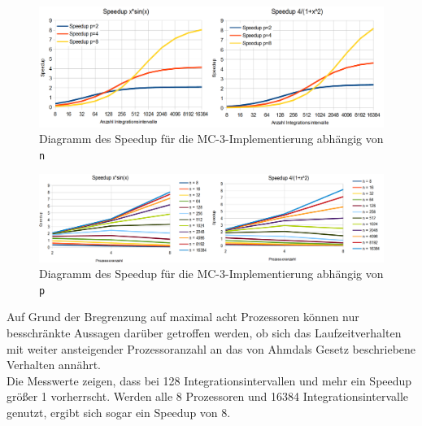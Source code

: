 \documentclass[a4paper,12pt]{scrartcl}
\begin{document}
\begin{figure}[htb]
  \begin{center}
    \includegraphics[width=1\hsize]{../mc3_speedup.png}
  \end{center}
  \caption{\label{mc3speedup}
    Diagramm des Speedup f\"ur die MC-3-Implementierung abh\"angig von \texttt{n}}
\end{figure}
\begin{figure}[htb]
  \begin{center}
    \includegraphics[width=1\hsize]{../mc3_speeduppercpu.png}
  \end{center}
  \caption{\label{mc3speeduppercpu}
    Diagramm des Speedup f\"ur die MC-3-Implementierung abh\"angig von \texttt{p}}
\end{figure}
Auf Grund der Bregrenzung auf maximal acht Prozessoren k\"onnen nur besschr\"ankte Aussagen dar\"uber getroffen werden, ob sich das Laufzeitverhalten
mit weiter ansteigender Prozessoranzahl an das von Ahmdals Gesetz beschriebene Verhalten ann\"ahrt.\\

Die Messwerte zeigen, dass bei 128 Integrationsintervallen und mehr ein Speedup gr\"o\ss{}er 1 vorherrscht. Werden alle 8 Prozessoren und 16384
Integrationsintervalle genutzt, ergibt sich sogar ein Speedup von 8.\\
\end{document}
